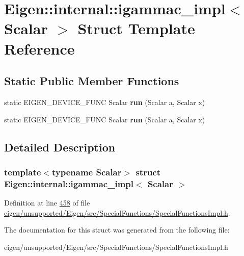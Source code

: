 \hypertarget{struct_eigen_1_1internal_1_1igammac__impl}{}\section{Eigen\+:\+:internal\+:\+:igammac\+\_\+impl$<$ Scalar $>$ Struct Template Reference}
\label{struct_eigen_1_1internal_1_1igammac__impl}
\subsection*{Static Public Member Functions}
\begin{DoxyCompactItemize}
\item 
\mbox{\label{struct_eigen_1_1internal_1_1igammac__impl_a3f7c5dcfb2f846fe33b0e3fdb5ac3fd2}} 
static E\+I\+G\+E\+N\+\_\+\+D\+E\+V\+I\+C\+E\+\_\+\+F\+U\+NC Scalar {\bfseries run} (Scalar a, Scalar x)
\item 
\mbox{\label{struct_eigen_1_1internal_1_1igammac__impl_a3f7c5dcfb2f846fe33b0e3fdb5ac3fd2}} 
static E\+I\+G\+E\+N\+\_\+\+D\+E\+V\+I\+C\+E\+\_\+\+F\+U\+NC Scalar {\bfseries run} (Scalar a, Scalar x)
\end{DoxyCompactItemize}


\subsection{Detailed Description}
\subsubsection*{template$<$typename Scalar$>$\newline
struct Eigen\+::internal\+::igammac\+\_\+impl$<$ Scalar $>$}



Definition at line \hyperlink{eigen_2unsupported_2_eigen_2src_2_special_functions_2_special_functions_impl_8h_source_l00458}{458} of file \hyperlink{eigen_2unsupported_2_eigen_2src_2_special_functions_2_special_functions_impl_8h_source}{eigen/unsupported/\+Eigen/src/\+Special\+Functions/\+Special\+Functions\+Impl.\+h}.



The documentation for this struct was generated from the following file\+:\begin{DoxyCompactItemize}
\item 
eigen/unsupported/\+Eigen/src/\+Special\+Functions/\+Special\+Functions\+Impl.\+h\end{DoxyCompactItemize}
